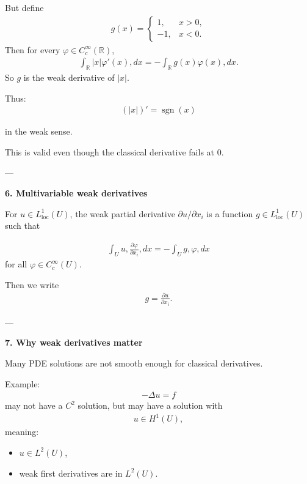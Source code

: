 \documentclass[12pt,a4paper]{report}
\begin{document}
\begin{description}
\begin{description}
But define
\begin{align*}
g(x)= \begin{cases}
1,&x>0,\\
-1,&x<0.
\end{cases}
\end{align*}
Then for every $\varphi\in C_c^\infty(\mathbb R)$,
\begin{align*}
\int_{\mathbb R}|x|\varphi'(x),dx = -\int_{\mathbb R}g(x)\varphi(x),dx.
\end{align*}
So $g$ is the weak derivative of $|x|$.

Thus:
\begin{align*}
(|x|)'=\operatorname{sgn}(x)
\end{align*}

in the weak sense.

This is valid even though the classical derivative fails at $0$.

---

\item \textbf{6. Multivariable weak derivatives}

For $u\in L^1_{\text{loc}}(U)$, the weak partial derivative $\partial u/\partial x_i$ is a function $g\in L^1_{\text{loc}}(U)$ such that

\begin{align*}
\int_U u,\frac{\partial \varphi}{\partial x_i},dx = -\int_U g,\varphi,dx
\end{align*}
for all $\varphi\in C_c^\infty(U)$.

Then we write
\begin{align*}
g=\frac{\partial u}{\partial x_i}.
\end{align*}

---

\item \textbf{7. Why weak derivatives matter}

Many PDE solutions are not smooth enough for classical derivatives.

Example:
\begin{align*}
-\Delta u=f
\end{align*}
may not have a $C^2$ solution, but may have a solution with
\begin{align*}
u\in H^1(U),
\end{align*}
meaning:
\begin{itemize}
\item $u\in L^2(U)$,
\item weak first derivatives are in $L^2(U)$.
\end{itemize}


\end{description}
\end{description}
\end{document}

